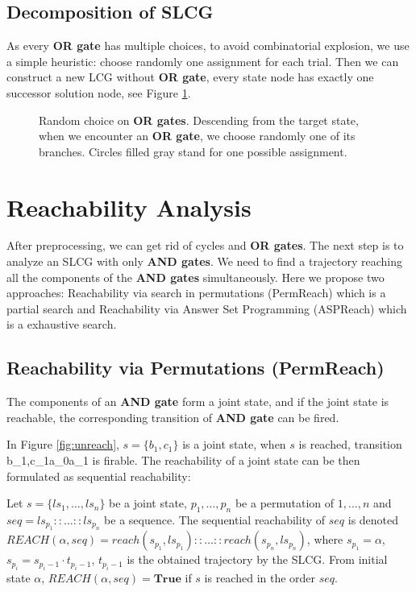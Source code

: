\subsection{Decomposition of SLCG}
As every \textbf{OR gate} has multiple choices, to avoid combinatorial explosion, we use a simple heuristic: 
choose randomly one assignment for each trial.
Then we can construct a new LCG without \textbf{OR gate}, every state node has exactly one successor solution node, see Figure \ref{fig:heuristics}.

\begin{figure}[ht]
    \centering
    
    \caption[Random choice on \textbf{OR gates}]{Random choice on \textbf{OR gates}. Descending from the target state, when we encounter an \textbf{OR gate}, we choose randomly one of its branches. Circles filled gray stand for one possible assignment.}
    \label{fig:heuristics}
\end{figure}

\section{Reachability Analysis}
After preprocessing, we can get rid of cycles and \textbf{OR gates}.
The next step is to analyze an SLCG with only \textbf{AND gates}.
We need to find a trajectory reaching all the components of the \textbf{AND gates} simultaneously.
Here we propose two approaches: Reachability via search in permutations (PermReach) which is a partial search and Reachability via Answer Set Programming (ASPReach) which is a exhaustive search.
\subsection{Reachability via Permutations (PermReach)}

The components of an \textbf{AND gate} form a joint state, and if the joint state is reachable, the corresponding transition of \textbf{AND gate} can be fired. 

In Figure \ref{fig:unreach}, $s=\{ b_1,c_1\}$ is a joint state, when $s$ is reached, transition \ac{b_1,c_1}{a_0}{a_1} is firable.
The reachability of a joint state can be then formulated as sequential reachability:
\begin{definition}
Let $s=\{ls_1,\ldots,ls_n\}$ be a joint state, $p_1,\ldots ,p_n$ be a permutation of $1,\ldots ,n$ and $seq=ls_{p_1}::\ldots::ls_{p_n}$ be a sequence.
The sequential reachability of $seq$ is denoted %
$REACH(\alpha,seq)=reach(s_{p_1},ls_{p_1})::\ldots::reach(s_{p_n},ls_{p_n})$, where $s_{p_1}=\alpha$, $s_{p_i}=s_{p_i-1}\cdot t_{p_i-1}$, $t_{p_i-1}$ is the obtained trajectory by the SLCG.
From initial state $\alpha$, $REACH(\alpha,seq)=\mathbf{True}$ if $s$ is reached in the order $seq$.
\end{definition}

